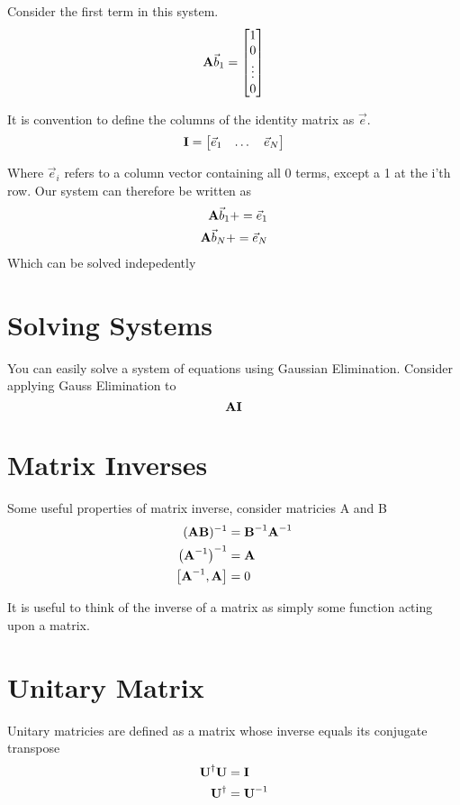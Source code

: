 \documentclass{article}
\newcommand{\be}{\begin{equation}}
\newcommand{\ee}{\end{equation}}
\newcommand{\dg}{\dagger}
\newcommand{\bA}{\mbox{\bf A}}
\newcommand{\bB}{\mbox{\bf B}}
\newcommand{\bI}{\mbox{\bf I}}
\newcommand{\bU}{\mbox{\bf U}}
\begin{document}
Consider the first term in this system.
\be
\bA\vec{b}_1 =
\begin{bmatrix}
    1 \\
    0 \\
    \vdots \\
     0
\end{bmatrix}
\ee

It is convention to define the columns of the identity matrix as $\vec{e}$.
\be
\bI = \begin{bmatrix}
        \vec{e}_1 & \dots  & \vec{e}_N
\end{bmatrix}
\ee

Where $\vec{e}_i$ refers to a column vector containing all 0 terms, except a 1 at the i'th row.
Our system can therefore be written as
\begin{align}
    \bA \vec{b}_1 + = \vec{e}_1\\
    \bA \vec{b}_N + = \vec{e}_N\\
\end{align}
Which can be solved indepedently

\section{Solving Systems}
You can easily solve a system of equations using Gaussian Elimination.
Consider applying Gauss Elimination to
\be
\bA\bI
\ee

\section{Matrix Inverses}
Some useful properties of matrix inverse, consider matricies A and B
\be
\begin{split}
    (\bA\bB)^{-1} &= \bB^{-1} \bA^{-1}\\
    \left(\bA^{-1}\right)^{-1} &= \bA\\
    \left[\bA^{-1},\bA\right] &= 0
\end{split}
\ee

It is useful to think of the inverse of a matrix as simply some function acting upon a matrix.

\section{Unitary Matrix}
Unitary matricies are defined as a matrix whose inverse equals its conjugate transpose
\be
\begin{split}
    \bU^\dg\bU&=\bI\\
    \bU^\dg&=\bU^{-1}
\end{split}
\ee
\end{document}
